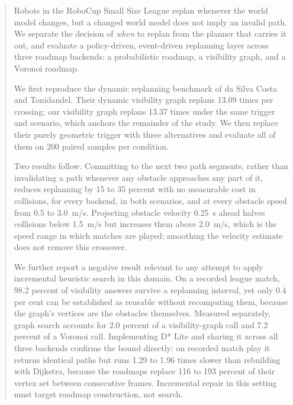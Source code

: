 ﻿%
%

\begin{abstract}
Robots in the RoboCup Small Size League replan whenever the world model
changes, but a changed world model does not imply an invalid path. We separate
the decision of \emph{when} to replan from the planner that carries it out, and
evaluate a policy-driven, event-driven replanning layer across three roadmap
backends: a probabilistic roadmap, a visibility graph, and a Voronoi roadmap.

We first reproduce the dynamic replanning benchmark of da Silva Costa and
Tonidandel. Their dynamic visibility graph replans 13.09 times per crossing;
our visibility graph replans 13.37 times under the same trigger and scenario,
which anchors the remainder of the study. We then replace their purely
geometric trigger with three alternatives and evaluate all of them on 200
paired samples per condition.

Two results follow. Committing to the next two path segments, rather than
invalidating a path whenever any obstacle approaches any part of it, reduces
replanning by 15 to 35 percent with no measurable cost in collisions, for
every backend, in both scenarios, and at every obstacle speed from 0.5 to
3.0~m/s. Projecting obstacle velocity 0.25~s ahead halves collisions below
1.5~m/s but increases them above 2.0~m/s, which is the speed range in which
matches are played; smoothing the velocity estimate does not remove this
crossover.

We further report a negative result relevant to any attempt to apply
incremental heuristic search in this domain. On a recorded league match, 98.2
percent of visibility answers survive a replanning interval, yet only 0.4 per
cent can be established as reusable without recomputing them, because the
graph's vertices are the obstacles themselves. Measured separately, graph
search accounts for 2.0 percent of a visibility-graph call and 7.2 percent of
a Voronoi call. Implementing D* Lite and sharing it across all three backends
confirms the bound directly: on recorded match play it returns identical paths
but runs 1.29 to 1.96 times slower than rebuilding with Dijkstra, because the
roadmaps replace 116 to 193 percent of their vertex set between consecutive
frames. Incremental repair in this setting must target roadmap construction,
not search.
\end{abstract}

